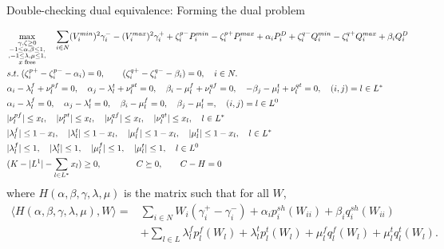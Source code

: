 \documentclass[xcolor=dvipsnames]{beamer}
\newcommand{\ii}{i}
\newcommand{\llll}{l}
\newcommand{\WW}{W}
\begin{document}
\begin{frame}{Double-checking dual equivalence: Forming the dual problem}
\begin{tiny}
\begin{subequations}
\begin{align}
& \max_{\substack{\gamma,\zeta \ge 0\\-1\le \alpha,\beta \le 1,\\,-1 \le \lambda,\mu \le 1,\\ x\; \text{free}}} \quad 
 \sum_{\ii \in N}  (V_\ii^{min})^2 \gamma_\ii^- - (V_\ii^{max})^2 \gamma_\ii^+ + \zeta_\ii^{p-}P_\ii^{min} - \zeta_\ii^{p+}P_\ii^{max} +\alpha_\ii P_\ii^D 
+ \zeta_\ii^{q-}Q_\ii^{min} - \zeta_\ii^{q+}Q_\ii^{max} + \beta_\ii Q_\ii^D \notag \\
&s.t.\; (\zeta_\ii^{p+}-\zeta_\ii^{p-} - \alpha_\ii) = 0, \qquad (\zeta_\ii^{q+}-\zeta_\ii^{q-} - \beta_\ii) = 0,\quad \ii \in N. \notag \\
&  \alpha_i -\lambda_\llll^f +  \nu_l^{pf} = 0, \quad \alpha_j - \lambda_l^t + \nu_l^{pt}=0, \quad \beta_i - \mu_l^f + \nu_l^{qf}=0,\quad -\beta_j - \mu_l^t + \nu_l^{qt}=0,\quad (i,j)=l \in L^* \notag \\
&  \alpha_i -\lambda_\llll^f = 0, \quad \alpha_j - \lambda_l^t=0, \quad \beta_i - \mu_l^f=0,\quad \beta_j - \mu_l^t=,\quad (i,j)=l \in L^0 \notag \\
& |\nu_l^{pf}| \le x_l,\quad|\nu_l^{pt}| \le x_l,\quad |\nu_l^{qf}| \le x_l,\quad|\nu_l^{qt}| \le x_l,\quad l \in L^* \notag \\
& |\lambda_l^f| \le 1-x_l,\quad |\lambda_l^t| \le 1-x_l,\quad|\mu_l^f| \le 1-x_l,\quad |\mu_l^t| \le 1-x_l,\quad l \in L^* \notag \\
& |\lambda_l^f| \le 1,\quad |\lambda_l^t| \le 1,\quad|\mu_l^f| \le 1,\quad |\mu_l^t| \le 1,\quad l \in L^0 \notag \\
& (K-|L^1|-\sum_{l \in L^*} x_l) \ge 0, \qquad\qquad C \succeq 0\notag, \qquad C-H = 0\\
\end{align}
\end{subequations}
where $H(\alpha,\beta,\gamma,\lambda,\mu)$ is the matrix such that for all $\WW$, 
\begin{align*}
\langle H(\alpha,\beta,\gamma,\lambda,\mu), W \rangle = &\sum_{\ii \in N} W_\ii(\gamma_\ii^+-\gamma_\ii^-) + \alpha_\ii p_\ii^{sh}(\WW_{ii}) + \beta_\ii q_\ii^{sh}(\WW_{ii}) \\
&+ \sum_{l \in L} \lambda_l^f p_l^f(\WW_l) + \lambda_l^t p_l^t(\WW_l) + \mu_l^f q_l^f(\WW_l) + \mu_l^t q_l^t(\WW_l).
\end{align*}
\end{tiny}
\end{frame}
\end{document}
